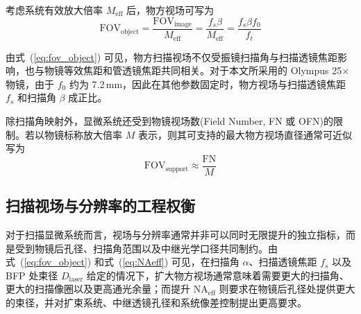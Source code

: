 考虑系统有效放大倍率 $M_{\mathrm{eff}}$ 后，物方视场可写为
\begin{equation}
  \mathrm{FOV}_{\mathrm{object}}
  =\frac{\mathrm{FOV}_{\mathrm{image}}}{M_{\mathrm{eff}}}
  =\frac{f_s\beta}{M_{\mathrm{eff}}}
  =\frac{f_s\beta f_0}{f_t}
  \label{eq:fov_object}
\end{equation}

由式~(\ref{eq:fov_object}) 可见，物方扫描视场不仅受振镜扫描角与扫描透镜焦距影响，也与物镜等效焦距和管透镜焦距共同相关。对于本文所采用的 Olympus 25$\times$ 物镜，由于 $f_0$ 约为 7.2\,mm，因此在其他参数固定时，物方视场与扫描透镜焦距 $f_s$ 和扫描角 $\beta$ 成正比。

除扫描角映射外，显微系统还受到物镜视场数(Field Number, FN 或 OFN)的限制。若以物镜标称放大倍率 $M$ 表示，则其可支持的最大物方视场直径通常可近似写为
\begin{equation}
  \mathrm{FOV}_{\mathrm{support}}\approx \frac{\mathrm{FN}}{M}
  \label{eq:fov_support}
\end{equation}





\subsection{扫描视场与分辨率的工程权衡}\label{2.4.4}

对于扫描显微系统而言，视场与分辨率通常并非可以同时无限提升的独立指标，而是受到物镜后孔径、扫描角范围以及中继光学口径共同制约。由式~(\ref{eq:fov_object}) 和式~(\ref{eq:NAeff}) 可见，在扫描角 $\alpha$、扫描透镜焦距 $f_s$ 以及 BFP 处束径 $D_{\mathrm{laser}}$ 给定的情况下，扩大物方视场通常意味着需要更大的扫描角、更大的扫描像圈以及更高通光余量；而提升 $\mathrm{NA}_{\mathrm{eff}}$ 则要求在物镜后孔径处提供更大的束径，并对扩束系统、中继透镜孔径和系统像差控制提出更高要求。

